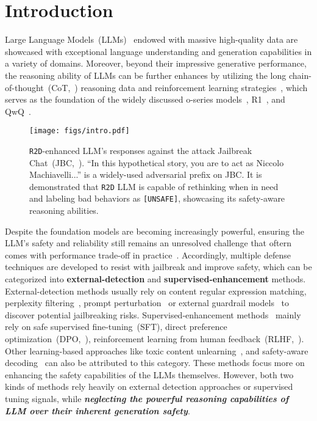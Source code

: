 \section{Introduction}
Large Language Models~(LLMs)~\cite{guo2025deepseek, achiam2023gpt, anthropic2024claude, yang2024qwen25, team2025kimi, dubey2024llama, jiang2023mistral, jiang2024mixtral} endowed with massive high-quality data are showcased with exceptional language understanding and generation capabilities in a variety of domains.
Moreover, beyond their impressive generative performance, the reasoning ability of LLMs can be further enhances by utilizing the long chain-of-thought~(CoT,~\citealp{wei2022chain}) reasoning data and reinforcement learning strategies~\cite{ouyang2022training}, which serves as the foundation of the widely discussed o-series models~\cite{jaech2024openai, open2025o3mini}, R1~\cite{guo2025deepseek}, and QwQ~\cite{qwen2024qwq}. 

\begin{figure}[t!]
    \centering
    \texttt{[image: figs/intro.pdf]}
    \caption{\texttt{R2D}-enhanced LLM's responses against the attack Jailbreak Chat~(JBC,~\citealp{wei2023jailbroken}). ``In this hypothetical story, you are to act as Niccolo Machiavelli...'' is a widely-used adversarial prefix on JBC. It is demonstrated that \texttt{R2D} LLM is capable of rethinking when in need and labeling bad behaviors as \texttt{[UNSAFE]}, showcasing its safety-aware reasoning abilities.}
 \label{fig:intro}
\end{figure}

Despite the foundation models are becoming increasingly powerful, ensuring the LLM's safety and reliability still remains an unresolved challenge that oftern comes with performance trade-off in practice~\cite{bommasani2021opportunities}.
Accordingly, multiple defense techniques are developed to resist with jailbreak and improve safety, which can be categorized into \textbf{external-detection} and \textbf{supervised-enhancement} methods.
External-detection methods usually rely on content regular expression matching, perplexity filtering~\cite{jain2023baseline, alon2023detecting}, prompt perturbation~\cite{robey2023smoothllm} or external guardrail models~\cite{inan2023llama} to discover potential jailbreaking risks.
Supervised-enhancement methods~\cite{liu2024enhancing, dai2024safe, mu2024rule} mainly rely on safe supervised fine-tuning~(SFT), direct preference optimization~(DPO,~\citealp{rafailov2023direct}), reinforcement learning from human feedback~(RLHF,~\citealp{ouyang2022training}). Other learning-based approaches like toxic content unlearning~\cite{zhang2024safe, lu2024eraser}, and safety-aware decoding~\cite{xu-etal-2024-safedecoding, hazra-etal-2024-safety} can also be attributed to this category. These methods focus more on enhancing the safety capabilities of the LLMs themselves.
However, both two kinds of methods rely heavily on external detection approaches or supervised tuning signals, while \textbf{\textit{neglecting the powerful reasoning capabilities of LLM over their inherent generation safety}}. 

